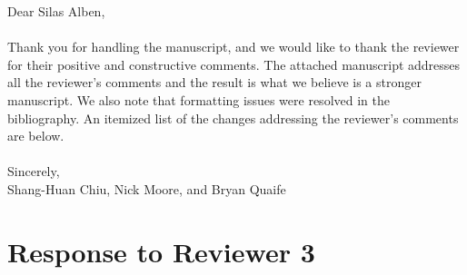 \documentclass[11pt]{article}
\begin{document}
\noindent
Dear Silas Alben,
\\ \\
\noindent
Thank you for handling the manuscript, and we would like to thank the
reviewer for their positive and constructive comments.  The attached
manuscript addresses all the reviewer's comments and the result is what
we believe is a stronger manuscript.  We also note that formatting
issues were resolved in the bibliography. An itemized list of the
changes addressing the reviewer's comments are below.
\\ \\
\noindent
Sincerely,
\\
\noindent
Shang-Huan Chiu, Nick Moore, and Bryan Quaife

\section*{Response to Reviewer 3}
\end{document}
